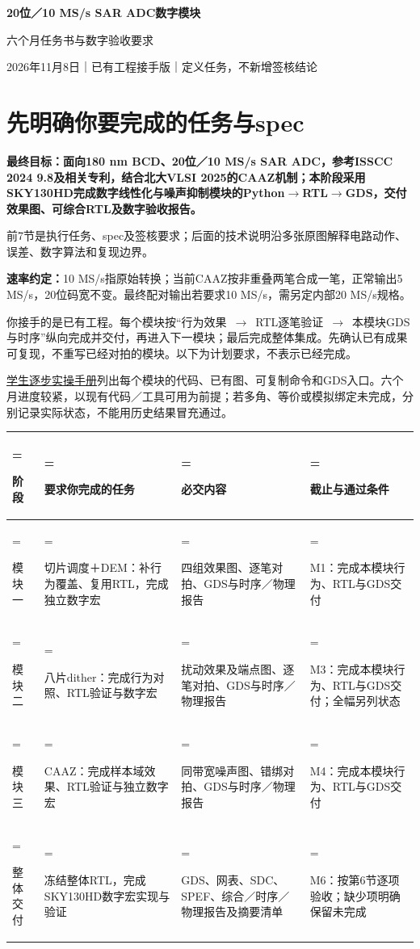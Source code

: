 \documentclass[zihao=5,a4paper,fontset=none]{ctexart}
\begin{document}
\begin{center}
{\LARGE\sffamily\bfseries 20位／10 MS/s SAR ADC数字模块}\par\vspace{3pt}
{\large\sffamily 六个月任务书与数字验收要求}\par\vspace{3pt}
{\small 2026年11月8日｜已有工程接手版｜定义任务，不新增签核结论}
\end{center}

\section{先明确你要完成的任务与spec}

\textbf{最终目标：面向180 nm BCD、20位／10 MS/s SAR ADC，参考ISSCC 2024 9.8及相关专利，结合北大VLSI 2025的CAAZ机制；本阶段采用SKY130HD完成数字线性化与噪声抑制模块的Python$\to$RTL$\to$GDS，交付效果图、可综合RTL及数字验收报告。}

前7节是执行任务、spec及签核要求；后面的技术说明沿多张原图解释电路动作、误差、数字算法和复现边界。

\textbf{速率约定：}10 MS/s指原始转换；当前CAAZ按非重叠两笔合成一笔，正常输出5 MS/s，20位码宽不变。最终配对输出若要求10 MS/s，需另定内部20 MS/s规格。

你接手的是已有工程。每个模块按``行为效果~$\to$~RTL逐笔验证~$\to$~本模块GDS与时序''纵向完成并交付，再进入下一模块；最后完成整体集成。先确认已有成果可复现，不重写已经对拍的模块。以下为计划要求，不表示已经完成。

\href{STUDENT_RUNBOOK.md}{学生逐步实操手册}列出每个模块的代码、已有图、可复制命令和GDS入口。六个月进度较紧，以现有代码／工具可用为前提；若多角、等价或模拟绑定未完成，分别记录实际状态，不能用历史结果冒充通过。

\begin{table}[H]
\small
  \centering
  \begin{tabularx}{\linewidth}{>{\hsize=0.45\hsize\linewidth=\hsize\raggedright\arraybackslash}X>{\hsize=1.25\hsize\linewidth=\hsize\raggedright\arraybackslash}X>{\hsize=1.25\hsize\linewidth=\hsize\raggedright\arraybackslash}X>{\hsize=1.05\hsize\linewidth=\hsize\raggedright\arraybackslash}X}
    \toprule
    阶段 & 要求你完成的任务 & 必交内容 & 截止与通过条件 \\
    \midrule
    模块一 & 切片调度＋DEM：补行为覆盖、复用RTL，完成独立数字宏 & 四组效果图、逐笔对拍、GDS与时序／物理报告 & M1：完成本模块行为、RTL与GDS交付 \\
    模块二 & 八片dither：完成行为对照、RTL验证与数字宏 & 扰动效果及端点图、逐笔对拍、GDS与时序／物理报告 & M3：完成本模块行为、RTL与GDS交付；全幅另列状态 \\
    模块三 & CAAZ：完成样本域效果、RTL验证与独立数字宏 & 同带宽噪声图、错绑对拍、GDS与时序／物理报告 & M4：完成本模块行为、RTL与GDS交付 \\
    整体交付 & 冻结整体RTL，完成SKY130HD数字宏实现与验证 & GDS、网表、SDC、SPEF、综合／时序／物理报告及摘要清单 & M6：按第6节逐项验收；缺少项明确保留未完成 \\
    \bottomrule
  \end{tabularx}
\end{table}
\end{document}
